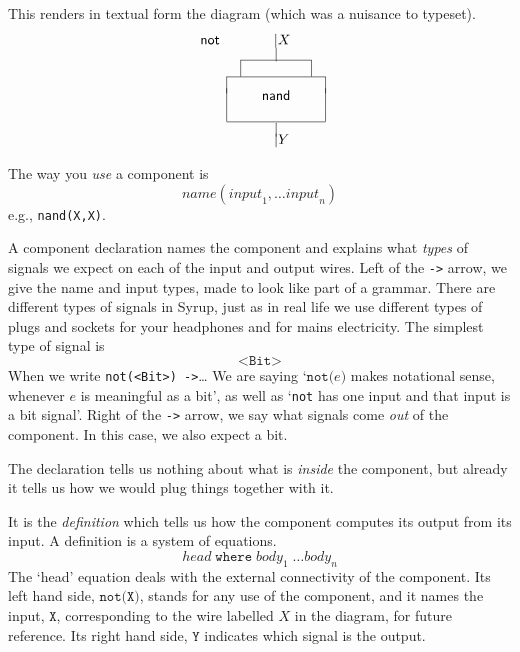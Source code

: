 \documentclass{article}
\begin{document}
This renders in textual form the diagram (which was a nuisance to typeset).
\[\begin{array}{lccccc}
    \mathsf{not} && & \hspace*{0.12in}|X & & \vspace*{-0.03in}\\
               && & | & & \vspace*{-0.03in}\\
    \cline{3-5}
       &        & \multicolumn{3}{|c|}{} & \\
    \cline{2-6}
    &\multicolumn{5}{|c|}{} \vspace*{-0.05in}\\
    &\multicolumn{5}{|c|}{\mathsf{nand}}  \\
    &\multicolumn{5}{|c|}{}\\
    \cline{2-6}
    \vspace*{-0.03in}
    &&& | && \vspace*{-0.03in}\\
    &&&\hspace*{0.11in} |Y && \\
\end{array}  \]

The way you \emph{use} a component is
\[
  \mathit{name}(\mathit{input}_1,\ldots \mathit{input}_n)
\]
e.g., \texttt{nand(X,X)}.

A component declaration names the component and
explains what \emph{types} of signals we expect
on each of the input and output wires.
Left of the \texttt{->} arrow, we give the name and
input types, made to look like part of a grammar.
There are
different types of signals in Syrup, just as in real life
we use different types of plugs and sockets for your headphones
and for mains electricity. The simplest type of signal is
\[
  \texttt{<Bit>}
\]
When we write \texttt{not(<Bit>) ->}\ldots
We are saying `$\texttt{not(}e\texttt{)}$ makes notational sense,
whenever $e$ is meaningful as a bit', as well as
`\texttt{not} has one input and that input is a bit signal'.
Right of the \texttt{->} arrow, we say what signals come \emph{out}
of the component. In this case, we also expect a bit.

The declaration tells us nothing about what is \emph{inside} the
component, but already it tells us how we would plug things together
with it.

It is the \emph{definition} which tells us how the component computes
its output from its input. A definition is a system of equations.
\[
  \mathit{head}\;\texttt{where}\; \mathit{body}_1\;\ldots \mathit{body}_n
\]
The `head' equation deals with the external connectivity of the
component. Its left hand side, $\texttt{not(X)}$, stands for any use
of the component, and it names the input, $\texttt{X}$, corresponding
to the wire labelled $X$ in the diagram, for future reference. Its
right hand side, $\texttt{Y}$ indicates which signal is the output.
\end{document}
